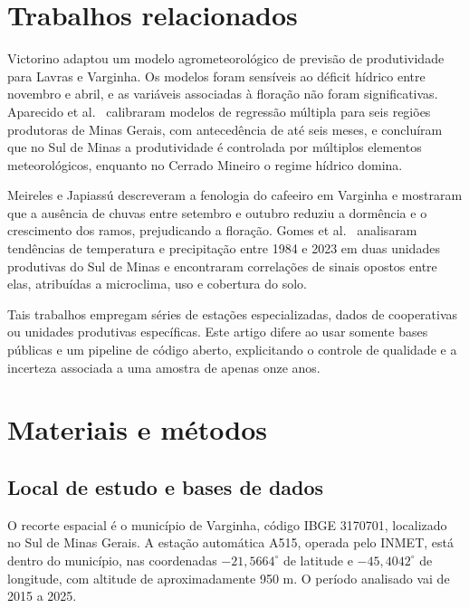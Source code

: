 \documentclass{RBCA}
\begin{document}
\section{Trabalhos relacionados}

Victorino \cite{victorino2015} adaptou um modelo agrometeorol\'ogico de previs\~ao de produtividade para Lavras e Varginha. Os modelos foram sens\'iveis ao d\'eficit h\'idrico entre novembro e abril, e as vari\'aveis associadas \`a flora\c{c}\~ao n\~ao foram significativas. Aparecido et al.\ \cite{aparecido2016} calibraram modelos de regress\~ao m\'ultipla para seis regi\~oes produtoras de Minas Gerais, com anteced\^encia de at\'e seis meses, e conclu\'iram que no Sul de Minas a produtividade \'e controlada por m\'ultiplos elementos meteorol\'ogicos, enquanto no Cerrado Mineiro o regime h\'idrico domina.

Meireles e Japiass\'u \cite{meireles2009} descreveram a fenologia do cafeeiro em Varginha e mostraram que a aus\^encia de chuvas entre setembro e outubro reduziu a dorm\^encia e o crescimento dos ramos, prejudicando a flora\c{c}\~ao. Gomes et al.\ \cite{gomes2026} analisaram tend\^encias de temperatura e precipita\c{c}\~ao entre 1984 e 2023 em duas unidades produtivas do Sul de Minas e encontraram correla\c{c}\~oes de sinais opostos entre elas, atribu\'idas a microclima, uso e cobertura do solo.

Tais trabalhos empregam s\'eries de esta\c{c}\~oes especializadas, dados de cooperativas ou unidades produtivas espec\'ificas. Este artigo difere ao usar somente bases p\'ublicas e um pipeline de c\'odigo aberto, explicitando o controle de qualidade e a incerteza associada a uma amostra de apenas onze anos.

\section{Materiais e m\'etodos}

\subsection{Local de estudo e bases de dados}

O recorte espacial \'e o munic\'ipio de Varginha, c\'odigo IBGE 3170701, localizado no Sul de Minas Gerais. A esta\c{c}\~ao autom\'atica A515, operada pelo INMET, est\'a dentro do munic\'ipio, nas coordenadas $-21{,}5664^\circ$ de latitude e $-45{,}4042^\circ$ de longitude, com altitude de aproximadamente 950 m. O per\'iodo analisado vai de 2015 a 2025.
\end{document}
